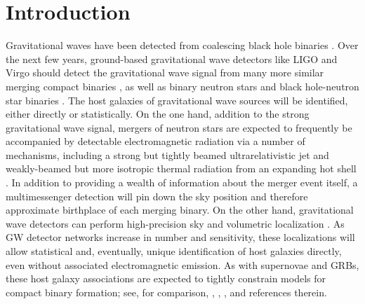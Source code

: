 \documentclass[nofootinbib,twocolumn,prd]{emulateapj}
\begin{document}

\section{Introduction}
Gravitational waves have been detected from  coalescing  black hole binaries \citep{DetectionPaper,LIGO-O1-BBH}. 
Over the next few years, ground-based gravitational wave detectors like LIGO 
and Virgo  should detect the gravitational
wave signal from many more similar merging compact binaries \citep{LIGO-O1-BBH,RatesPaper,gwastro-EventPopsynPaper-2016}, as well as  binary  neutron stars and black hole-neutron star binaries \citep{LIGO-Inspiral-Rates,popsyn-LowMetallicityImpact2c-StarTrackRevised-2014}.
%
The host galaxies of gravitational wave sources will be identified, either directly or statistically.  
On the one hand, addition to the strong gravitational wave signal, mergers of neutron stars are expected to  frequently be accompanied by detectable
electromagnetic radiation  via a number of  mechanisms, including a strong but tightly beamed
ultrarelativistic jet and weakly-beamed but more isotropic thermal radiation from an expanding hot shell
\citep[see,e.g.,][and references therein]{2013PhRvL.111r1101C,short-grb-GWCoincidenceEM-MetzgerBerger2011}.  
In addition to providing a wealth of information about the merger event itself, a multimessenger detection will pin down
the sky position and therefore approximate birthplace of each merging binary.    
%
On the other hand, gravitational wave detectors can perform high-precision sky and volumetric localization \citep{2016LRR....19....1A,2016arXiv160307333S}.  As GW detector
networks increase in number and sensitivity, these localizations will allow statistical and, eventually, unique identification of
host galaxies directly, even without associated electromagnetic emission.
%
As with supernovae and  GRBs, these host galaxy associations   are expected to tightly constrain models for compact binary
formation; see, for comparison,  \citet{2011MNRAS.412.1508M}, \citet{long-grb-GuettaPiran2007},
\citet{2014ARAA..52...43B}, and references therein. %
%
\end{document}
